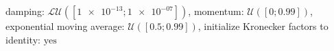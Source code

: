 damping: $\mathcal{LU}([\num[scientific-notation=true]{1e-13}; \num[scientific-notation=true]{1e-07}])$, momentum: $\mathcal{U}([\num[scientific-notation=false]{0}; \num[scientific-notation=true]{0.99}])$, exponential moving average: $\mathcal{U}([\num[scientific-notation=true]{0.5}; \num[scientific-notation=true]{0.99}])$, initialize Kronecker factors to identity: $\text{yes}$